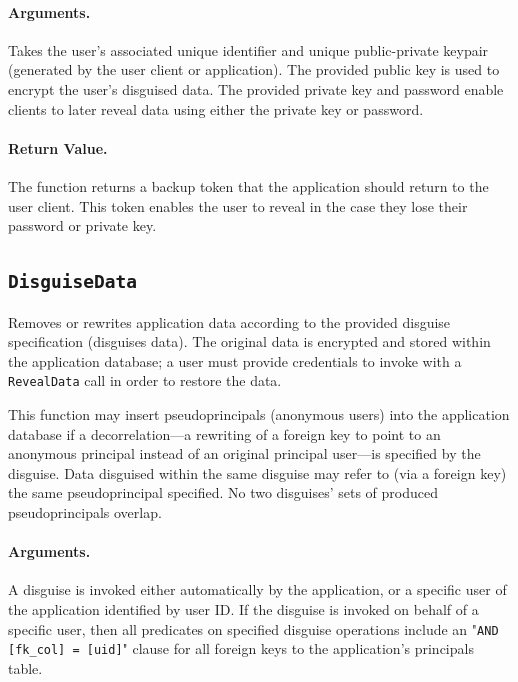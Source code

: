     \paragraph{Arguments.} Takes the user's associated unique identifier and unique
    public-private keypair (generated by the user
    client or application).
    The provided public key is used to encrypt the user's disguised data. The
    provided private key and password enable clients to later reveal data using
    either the private key or password.

    \paragraph{Return Value.} 
    The function returns a backup token that the application should return to
    the user client. This token enables the user to reveal in the case they lose
    their password or private key.


\subsection{\texttt{DisguiseData}}

    Removes or rewrites application data according to the provided disguise
    specification (\ie disguises data). The original data is encrypted and
    stored within the application database; a user must provide credentials to
    invoke with a \texttt{RevealData} call in order to restore the data.
    
    This function may insert pseudoprincipals (anonymous users) into the
    application database if a decorrelation---a rewriting of a foreign key to
    point to an anonymous principal instead of an 
    original principal user---is specified by the disguise.
     Data disguised within the
    same disguise may refer to (via a foreign key) the same pseudoprincipal
    specified.
    No two disguises' sets of produced pseudoprincipals overlap. 

    \paragraph{Arguments.} 
    A disguise is invoked either automatically by the application, or a specific
    user of the application identified by user ID. 
    If the disguise is invoked on behalf of a specific user, then all predicates
    on specified disguise operations include an "\texttt{AND [fk\_col] = [uid]}"
    clause for all foreign keys to the application's principals table.

